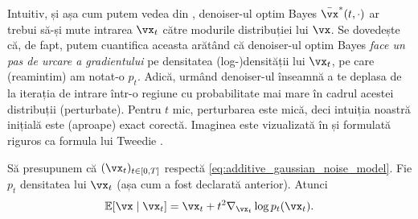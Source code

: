 \documentclass[../../book-main_ro.tex]{subfiles}
\begin{document}
Intuitiv, și așa cum putem vedea din , denoiser-ul optim Bayes \(\bar{\vx}^{\ast}(t, \cdot)\) ar trebui să-și mute intrarea \(\vx_{t}\) către modurile distribuției lui \(\vx\). Se dovedește că, de fapt, putem cuantifica aceasta arătând că denoiser-ul optim Bayes \textit{face un pas de urcare a gradientului} pe densitatea (log-)densității lui \(\vx_{t}\), pe care (reamintim) am notat-o \(p_{t}\). Adică, urmând denoiser-ul înseamnă a te deplasa de la iterația de intrare într-o regiune cu probabilitate mai mare în cadrul acestei distribuții (perturbate). Pentru \(t\) mic, perturbarea este mică, deci intuiția noastră inițială este (aproape) exact corectă. Imaginea este vizualizată în  și formulată riguros ca formula lui Tweedie \cite{Robbins1956AnEB}.
\begin{theorem}\label{thm:tweedie}
	Să presupunem că \((\vx_{t})_{t \in [0, T]}\) respectă \eqref{eq:additive_gaussian_noise_model}. Fie \(p_{t}\) densitatea lui \(\vx_{t}\) (așa cum a fost declarată anterior). Atunci
	\begin{equation}\label{eq:tweedie}
		\Ex[\vx \mid \vx_{t}] = \vx_{t} + t^{2}\nabla_{\vx_{t}} \log p_{t}(\vx_{t}).
	\end{equation}
\end{theorem}
\end{document}
